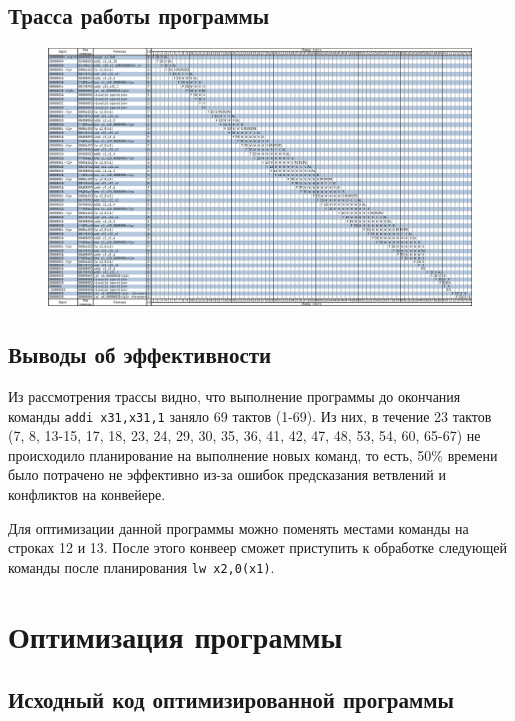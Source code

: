 \pagebreak

\subsection{Трасса работы программы}

\begin{figure}
	\includegraphics[width=\linewidth]{img/init.png}
\end{figure}

\subsection{Выводы об эффективности}

{\sloppy
Из рассмотрения трассы видно, что выполнение программы до окончания команды \verb|addi x31,x31,1| заняло 69 тактов (1-69). Из них, в течение 23 тактов (7, 8, 13-15, 17, 18, 23, 24, 29, 30, 35, 36, 41, 42, 47, 48, 53, 54, 60, 65-67) не происходило планирование на выполнение новых команд, то есть, 50\% времени было потрачено не эффективно из-за ошибок предсказания ветвлений и конфликтов на конвейере.\par}

{\sloppy
Для оптимизации данной программы можно поменять местами команды на строках 12 и 13. После этого конвеер сможет приступить к обработке следующей команды после планирования \verb|lw x2,0(x1)|.\par}

\pagebreak

\section{Оптимизация программы}

\subsection{Исходный код оптимизированной программы}

